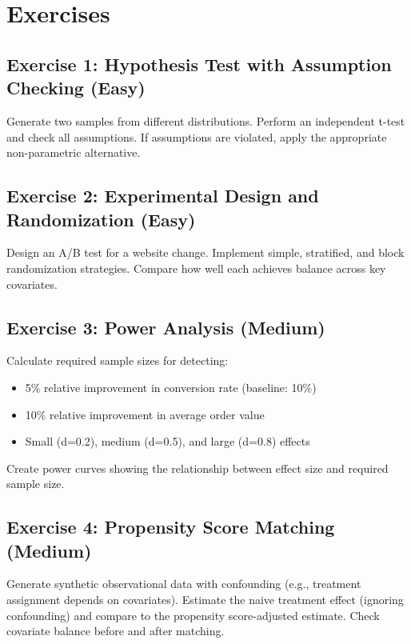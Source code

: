\section{Exercises}

\subsection{Exercise 1: Hypothesis Test with Assumption Checking (Easy)}

Generate two samples from different distributions. Perform an independent t-test and check all assumptions. If assumptions are violated, apply the appropriate non-parametric alternative.

\subsection{Exercise 2: Experimental Design and Randomization (Easy)}

Design an A/B test for a website change. Implement simple, stratified, and block randomization strategies. Compare how well each achieves balance across key covariates.

\subsection{Exercise 3: Power Analysis (Medium)}

Calculate required sample sizes for detecting:
\begin{itemize}
    \item 5\% relative improvement in conversion rate (baseline: 10\%)
    \item 10\% relative improvement in average order value
    \item Small (d=0.2), medium (d=0.5), and large (d=0.8) effects
\end{itemize}

Create power curves showing the relationship between effect size and required sample size.

\subsection{Exercise 4: Propensity Score Matching (Medium)}

Generate synthetic observational data with confounding (e.g., treatment assignment depends on covariates). Estimate the naive treatment effect (ignoring confounding) and compare to the propensity score-adjusted estimate. Check covariate balance before and after matching.

